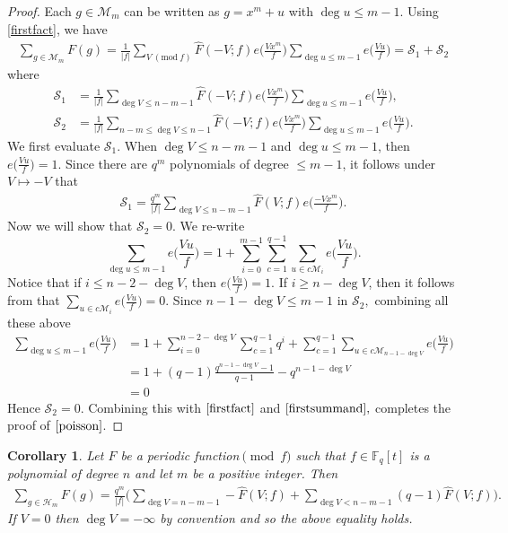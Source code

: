\documentclass[12pt,reqno]{amsart}
\newcommand{\Mod}[1]{\ (\mathrm{mod}\ #1)}
\newcommand{\BF}{\mathbb{F}}
\newcommand{\CM}{\mathcal{M}}
\newcommand{\CH}{\mathcal{H}}
\newcommand{\CS}{\mathcal{S}}
\newtheorem{cor}[lem]{Corollary}
\begin{document}
\begin{proof}
Each $g \in \CM_{m}$ can be written as $g = x^m + u $ with $\deg u \leq m-1.$ Using \eqref{firstfact}, we have 
\begin{align*}
 \sum\limits_{g \in \CM_{m}} F(g) = \frac{1}{|f|} \sum\limits_{V\Mod f} \widehat{F}(-V;f) e \Big ( \frac{Vx^m}{f} \Big) \sum\limits_{\deg u \leq m-1} e\Big( \frac{Vu}{f} \Big) = \CS_1 + \CS_2
 \end{align*}
where 
\begin{align*}
 \CS_1 &= \frac{1}{|f|} \sum\limits_{\deg V \leq n-m-1} \widehat{F}(-V;f) e \Big ( \frac{Vx^m}{f} \Big) \sum\limits_{\deg u \leq m-1} e\Big(\frac{Vu}{f} \Big), \\
 \CS_2 &= \frac{1}{|f|} \sum\limits_{n-m \leq \deg V \leq n-1} \widehat{F}(-V;f) e \Big ( \frac{Vx^m}{f} \Big) \sum\limits_{\deg u \leq m-1} e\Big(\frac{Vu}{f} \Big).
\end{align*}
We first evaluate $\CS_1$. When $\deg V \leq n-m-1$ and $\deg u \leq m-1$, then $e \Big( \frac{Vu}{f} \Big ) = 1.$ Since there are $q^m$ polynomials of degree $ \leq m-1$, it follows under $V \mapsto -V$ that
\begin{align}\label{firstsummand}
\CS_1 = \frac{q^m}{|f|} \sum\limits_{\deg V \leq n-m-1} \widehat{F}(V;f) e \Big ( \frac{-Vx^m}{f} \Big ).
\end{align}
Now we will show that $\CS_2=0.$ We re-write
$$
\sum\limits_{\deg u \leq m-1} e \Big(\frac{Vu}{f} \Big) = 1 + \sum\limits_{i=0}^{m-1}\sum\limits_{c=1}^{q-1}\sum\limits_{u \in c\CM_i} e\Big(\frac{Vu}{f}\Big).
$$
Notice that if $i \leq n-2-\deg V$, then $e \Big (\frac{Vu}{f} \Big )= 1.$ If $ i \geq n - \deg V$, then it follows from \cite[Lemma 3.7]{Hayes1966} that $\sum\limits_{u \in c\CM_i} e\Big( \frac{Vu}{f} \Big ) = 0. $ Since $n - 1 - \deg V \leq m - 1$ in $\CS_2,$ combining all these above
\begin{align*}
\sum\limits_{\deg u \leq m-1} e \Big(\frac{Vu}{f} \Big) &= 1 + \sum\limits_{i=0}^{n-2-\deg V} \sum\limits_{c=1}^{q-1} q^i + \sum\limits_{c=1}^{q-1} 
\sum\limits_{u \in c\CM_{n-1-\deg V}} e\Big (\frac{Vu}{f} \Big ) \\
&= 1 + (q-1) \frac{q^{n-1-\deg V} - 1}{q-1} - q^{n-1-\deg V} \\
&= 0
\end{align*}
Hence $\CS_2 = 0$. Combining this with $\eqref{firstfact}$ and $\eqref{firstsummand},$ completes the proof of $\eqref{poisson}$.
\end{proof}


\begin{cor}\label{non-monicpoisson}
     Let $F$ be a periodic function$\pmod f$ such that $f \in \BF_{q}[t]$ is a polynomial of degree $n$ and let $m$ be a positive integer. Then
    \begin{align}\label{poisson2}
    \sum\limits_{g \in \CH_{m}}  F(g) = \frac{q^m}{|f|} \Big (\sum\limits_{\deg V = n-m-1} -\widehat{F}(V;f) + \sum\limits_{\deg V < n-m-1} (q-1)\widehat{F}(V;f) \Big ).       
    \end{align}
If $V=0$ then $\deg V = -\infty$ by convention and so the above equality holds. 
\end{cor}
\end{document}
